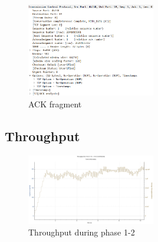 \documentclass{exam}
\begin{document}
\begin{figure}[H]
    \centering
    \includegraphics[width=0.50\textwidth]{TWH_Ack.png}
    \caption{ACK fragment}
    \label{fig:ack_fragment}
\end{figure}

\subsection{Throughput}
\begin{figure}[H]
    \centering
    \includegraphics[width=0.50\textwidth]{throughput_phase1-2.png}
    \caption{Throughput during phase 1-2}
    \label{fig:throughput_1-2}
\end{figure}
\end{document}
